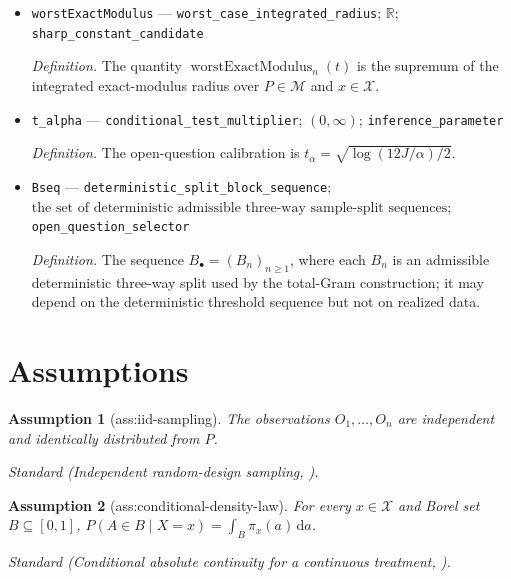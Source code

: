 \documentclass{article}
\newtheorem{assumption}{Assumption}
\begin{document}
\begin{itemize}
  \par\smallskip\noindent\emph{Definition.} The quantity \(\operatorname{exactModulusHandle}(P,I_2,x,\ell,\beta,\kappa,L,c_-,c_+,p_{\min},\delta_n,h_n,t)\) is the real-valued integral of \(\operatorname{realizedExactModulus}_{z,x}(t)\) under the \(n\)-fold iid observed-design law induced by \(P\).
  \item \texttt{worstExactModulus} --- \texttt{worst\_\allowbreak{}case\_\allowbreak{}integrated\_\allowbreak{}radius}; \(\mathbb R\); \texttt{sharp\_\allowbreak{}constant\_\allowbreak{}candidate}
  \par\smallskip\noindent\emph{Definition.} The quantity \(\operatorname{worstExactModulus}_n(t)\) is the supremum of the integrated exact-modulus radius over \(P\in\mathcal M\) and \(x\in\mathcal X\).
  \item \texttt{t\_\allowbreak{}alpha} --- \texttt{conditional\_\allowbreak{}test\_\allowbreak{}multiplier}; \((0,\infty)\); \texttt{inference\_\allowbreak{}parameter}
  \par\smallskip\noindent\emph{Definition.} The open-question calibration is \(t_\alpha=\sqrt{\log(12J/\alpha)/2}\).
  \item \texttt{Bseq} --- \texttt{deterministic\_\allowbreak{}split\_\allowbreak{}block\_\allowbreak{}sequence}; \(\text{the set of deterministic admissible three-way sample-split sequences}\); \texttt{open\_\allowbreak{}question\_\allowbreak{}selector}
  \par\smallskip\noindent\emph{Definition.} The sequence \(B_{\bullet}=(B_n)_{n\geq1}\), where each \(B_n\) is an admissible deterministic three-way split used by the total-Gram construction; it may depend on the deterministic threshold sequence but not on realized data.
\end{itemize}

\section{Assumptions}

\begin{assumption}[ass:iid-sampling]\label{ass:iid-sampling}
The observations \(O_1,\ldots,O_n\) are independent and identically distributed from \(P\).
\par\smallskip\noindent\emph{Standard} (Independent random-design sampling, \cite{Gaiffas2005DegenerateDesign}).
\end{assumption}

\begin{assumption}[ass:conditional-density-law]\label{ass:conditional-density-law}
For every \(x\in\mathcal X\) and Borel set \(B\subseteq[0,1]\), \(P(A\in B\mid X=x)=\int_B\pi_x(a)\,\mathrm da\).
\par\smallskip\noindent\emph{Standard} (Conditional absolute continuity for a continuous treatment, \cite{DiazWilliamsHoffmanSchenck2023}).
\end{assumption}
\end{document}
